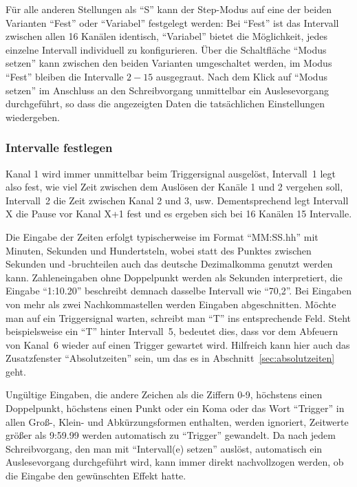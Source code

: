 \documentclass[paper=a4, open=any, numbers=noenddot]{scrbook}
\begin{document}
					Für alle anderen Stellungen als \enquote{S} kann der Step-Modus auf eine der beiden Varianten \enquote{Fest} oder \enquote{Variabel} festgelegt werden: Bei \enquote{Fest} ist das Intervall zwischen allen 16 Kanälen identisch, \enquote{Variabel} bietet die Möglichkeit, jedes einzelne Intervall individuell zu konfigurieren. Über die Schaltfläche \enquote{Modus setzen} kann zwischen den beiden Varianten umgeschaltet werden, im Modus \enquote{Fest} bleiben die Intervalle $2-15$ ausgegraut. Nach dem Klick auf \enquote{Modus setzen} im Anschluss an den Schreibvorgang unmittelbar ein Auslesevorgang durchgeführt, so dass die angezeigten Daten die tatsächlichen Einstellungen wiedergeben.

				\subsubsection*{Intervalle festlegen}

					Kanal 1 wird immer unmittelbar beim Triggersignal ausgelöst, Intervall~1 legt also fest, wie viel Zeit zwischen dem Auslösen der Kanäle 1 und 2 vergehen soll, Intervall~2 die Zeit zwischen Kanal 2 und 3, usw. Dementsprechend legt Intervall X die Pause vor Kanal X+1 fest und es ergeben sich bei 16 Kanälen 15 Intervalle.

					Die Eingabe der Zeiten erfolgt typischerweise im Format \enquote{MM:SS.hh} mit Minuten, Sekunden und Hundertsteln, wobei statt des Punktes zwischen Sekunden und -bruchteilen auch das deutsche Dezimalkomma genutzt werden kann. Zahleneingaben ohne Doppelpunkt werden als Sekunden interpretiert, die Eingabe \enquote{1:10.20} beschreibt demnach dasselbe Intervall wie \enquote{70,2}. Bei Eingaben von mehr als zwei Nachkommastellen werden Eingaben abgeschnitten. Möchte man auf ein Triggersignal warten, schreibt man \enquote{T} ins entsprechende Feld. Steht beispielsweise ein \enquote{T} hinter Intervall~5, bedeutet dies, dass vor dem Abfeuern von Kanal~6 wieder auf einen Trigger gewartet wird. Hilfreich kann hier auch das Zusatzfenster \enquote{Absolutzeiten} sein, um das es in Abschnitt~\ref{sec:absolutzeiten} geht.

					Ungültige Eingaben, die andere Zeichen als die Ziffern 0-9, höchstens einen Doppelpunkt, höchstens einen Punkt oder ein Koma oder das Wort \enquote{Trigger} in allen Groß-, Klein- und Abkürzungsformen enthalten, werden ignoriert, Zeitwerte größer als 9:59.99 werden automatisch zu \enquote{Trigger} gewandelt. Da nach jedem Schreibvorgang, den man mit \enquote{Intervall(e) setzen} auslöst, automatisch ein Auslesevorgang durchgeführt wird, kann immer direkt nachvollzogen werden, ob die Eingabe den gewünschten Effekt hatte.
\end{document}
